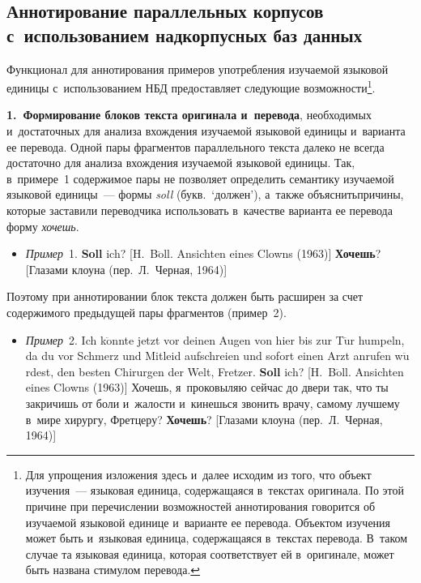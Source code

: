 \begin{multicols}{2}
\section{Аннотирование параллельных корпусов с~использованием 
надкорпусных баз данных}

Функционал для аннотирования примеров употребления изучаемой языковой 
единицы с~использованием НБД предоставляет 
следующие возможности\footnote{Для упрощения изложения здесь и~далее исходим из 
того, что объект изучения~--- языковая единица, содержащаяся в~текстах оригинала. По этой 
причине при перечислении возможностей аннотирования говорится об изучаемой языковой 
единице и~варианте ее перевода. Объектом изучения может быть и~языковая единица, 
содержащаяся в~текстах перевода. В~таком случае та языковая единица, которая соответствует ей в~оригинале, может быть названа стимулом перевода.}.

\textbf{1.\ Формирование блоков текста оригинала и~перевода}, 
необходимых и~достаточных для анализа вхож\-де\-ния изучаемой языковой 
единицы и~варианта ее перевода. Одной пары фрагментов параллельного текста 
далеко не всегда достаточно для анализа вхож\-де\-ния изучаемой языковой 
единицы. Так, в~примере~1 содержимое пары не позволяет определить 
семантику изучаемой языковой единицы~--- формы \textit{soll} (букв.\ 
`должен'), а~также объяснить\linebreak причины, которые заставили переводчика 
использовать в~качестве варианта ее перевода форму \textit{хочешь}.

\begin{itemize}
\item[\,] \textit{Пример}~1. \textbf{Soll} ich? [H.~B$\ddot{\mbox{o}}$ll. Ansichten 
eines Clowns (1963)] \textbf{Хочешь}? [Глазами клоуна (пер.\ Л.~Черная, 1964)]
\end{itemize}
Поэтому при аннотировании блок текста должен быть расширен за счет 
содержимого предыдущей пары фрагментов (пример~2).

\begin{itemize}
\item[\,] \textit{Пример}~2. Ich k$\ddot{\mbox{o}}$nnte jetzt vor deinen Augen von 
hier bis zur T$\ddot{\mbox{u}}$r humpeln, \mbox{da{\!\ptb{\!\ss}}} du vor Schmerz und Mitleid 
aufschreien und sofort einen Arzt anrufen w$\ddot{\mbox{u}}$rdest, den besten Chirurgen der Welt, 
Fretzer. \textbf{Soll} ich? [H.~B$\ddot{\mbox{o}}$ll. Ansichten eines Clowns (1963)] 
Хочешь, я~проковыляю сейчас до двери так, что ты закричишь от боли и~жалости и~кинешься звонить врачу, самому лучшему в~мире хирургу, Фретцеру? 
\textbf{Хочешь}? [Глазами клоуна (пер.\ Л.~Черная, 1964)]
\end{itemize}


\end{multicols}
